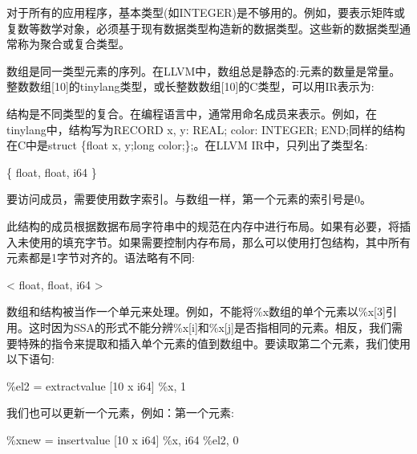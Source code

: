 对于所有的应用程序，基本类型(如INTEGER)是不够用的。例如，要表示矩阵或复数等数学对象，必须基于现有数据类型构造新的数据类型。这些新的数据类型通常称为聚合或复合类型。\par

数组是同一类型元素的序列。在LLVM中，数组总是静态的:元素的数量是常量。整数数组[10]的tinylang类型，或长整数数组[10]的C类型，可以用IR表示为:\par

\begin{tcolorbox}[colback=white,colframe=black]
[10 x i64]
\end{tcolorbox}

结构是不同类型的复合。在编程语言中，通常用命名成员来表示。例如，在tinylang中，结构写为RECORD x, y: REAL; color: INTEGER; END;同样的结构在C中是struct \{float x, y;long color;\};。在LLVM IR中，只列出了类型名:\par

\begin{tcolorbox}[colback=white,colframe=black]
\{ float, float, i64 \}
\end{tcolorbox}

要访问成员，需要使用数字索引。与数组一样，第一个元素的索引号是0。\par

此结构的成员根据数据布局字符串中的规范在内存中进行布局。如果有必要，将插入未使用的填充字节。如果需要控制内存布局，那么可以使用打包结构，其中所有元素都是1字节对齐的。语法略有不同:\par

\begin{tcolorbox}[colback=white,colframe=black]
<{ float, float, i64 }>
\end{tcolorbox}

数组和结构被当作一个单元来处理。例如，不能将\%x数组的单个元素以\%x[3]引用。这时因为SSA的形式不能分辨\%x[i]和\%x[j]是否指相同的元素。相反，我们需要特殊的指令来提取和插入单个元素的值到数组中。要读取第二个元素，我们使用以下语句:\par

\begin{tcolorbox}[colback=white,colframe=black]
\%el2 = extractvalue [10 x i64] \%x, 1
\end{tcolorbox}

我们也可以更新一个元素，例如：第一个元素:\par

\begin{tcolorbox}[colback=white,colframe=black]
\%xnew = insertvalue [10 x i64] \%x, i64 \%el2, 0
\end{tcolorbox}

